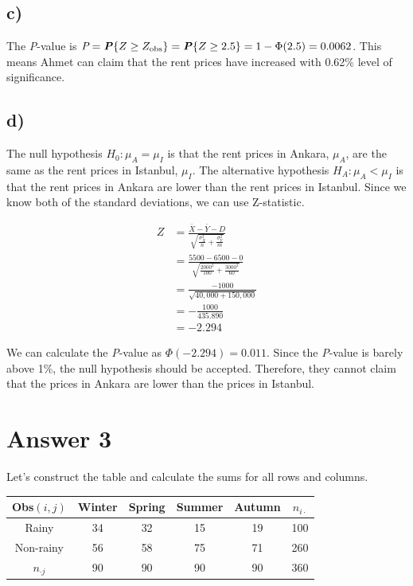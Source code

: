 \documentclass[12pt]{article}
\begin{document}
\subsection*{c)}

The \textit{P}-value is $\textit{P} = \textbf{\textit{P}}\{Z \geq Z_\text{obs}\}
= \textbf{\textit{P}}\{Z \geq 2.5\} = 1 - \Phi(2.5) = 0.0062$. This means Ahmet
can claim that the rent prices have increased with 0.62\% level of significance.

\subsection*{d)}

The null hypothesis $H_0: \mu_A = \mu_I$ is that the rent prices in Ankara,
$\mu_A$, are the same as the rent prices in Istanbul, $\mu_I$. The alternative
hypothesis $H_A: \mu_A < \mu_I$ is that the rent prices in Ankara are lower than
the rent prices in Istanbul. Since we know both of the standard deviations, we
can use Z-statistic.

\begin{align*}
    Z &= \frac{\bar{X} - \bar{Y} - D}
              {\sqrt{\frac{\sigma_X^2}{n}+\frac{\sigma_Y^2}{m}}} \\[0.75ex]
    &= \frac{5500 - 6500 - 0}
            {\sqrt{\frac{2000^2}{100}+\frac{3000^2}{60}}} \\[0.75ex]
    &= \frac{-1000}{\sqrt{40,000+150,000}} \\[0.75ex]
    &= -\frac{1000}{435.890} \\[0.75ex]
    &= -2.294
\end{align*}

We can calculate the \textit{P}-value as $\Phi(-2.294) = 0.011$. Since the
\textit{P}-value is barely above 1\%, the null hypothesis should be accepted.
Therefore, they cannot claim that the prices in Ankara are lower than the prices
in Istanbul.


\section*{Answer 3}

Let's construct the table and calculate the sums for all rows and columns.

\begin{center}
\begin{tabular}{c|c c c c|c}
Obs$(i,j)$    & Winter & Spring & Summer & Autumn & $n_{i \cdot}$ \\
\hline
Rainy         & 34 & 32 & 15 & 19 & 100 \\
Non-rainy     & 56 & 58 & 75 & 71 & 260 \\
\hline
$n_{\cdot j}$ & 90 & 90 & 90 & 90 & 360 \\
\end{tabular}
\end{center}
\end{document}
